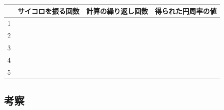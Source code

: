 \newpage

\subjikken{}

\hspace*{-\parindent}
\begin{tabular}{|c|c|c|c|}
\hline
& サイコロを振る回数 & 計算の繰り返し回数 & 得られた円周率の値 \\
\hline\hline
1&&&\\
\hline
2&&&\\
\hline
3&&&\\
\hline
4&&&\\
\hline
5&&&\\
\hline
\end{tabular}


\subsection*{考察}

